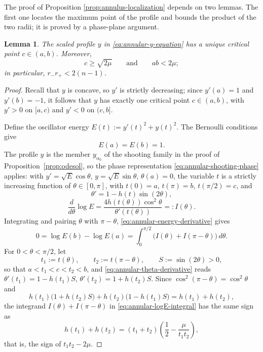 \documentclass[11pt]{article}
\numberwithin{equation}{section}
\newtheorem{lemma}[theorem]{Lemma}
\theoremstyle{definition}
\begin{document}
The proof of Proposition \ref{prop:annulus-localization} depends on two lemmas. The first one locates the maximum point of the profile and bounds the product of the two radii; it is proved by a phase-plane argument.

\begin{lemma}\label{lem:annular-phase}
The scaled profile $y$ in \eqref{eq:annular-y-equation} has a unique critical point $c\in(a,b)$. Moreover,
\[
    c\geq\sqrt{2\mu}
    \qquad\text{and}\qquad
    ab<2\mu;
\]
in particular, $r_-r_+<2(n-1)$.
\end{lemma}

\begin{proof}
Recall that $y$ is concave, so $y'$ is strictly decreasing; since $y'(a)=1$ and $y'(b)=-1$, it follows that $y$ has exactly one critical point $c\in(a,b)$, with $y'>0$ on $[a,c)$ and $y'<0$ on $(c,b]$.


Define the oscillator energy $E(t):=y'(t)^2+y(t)^2$. The Bernoulli conditions give
\begin{equation}\label{eq:annular-energy-derivative}
    E(a)=E(b)=1.
\end{equation}
The profile $y$ is the member $y_{\alpha_0}$ of the shooting family in the proof of Proposition~\ref{prop:odesol}, so the phase representation \eqref{eq:annular-shooting-phase} applies: with $y'=\sqrt E\cos\theta$, $y=\sqrt E\sin\theta$, $\theta(a)=0$, the variable $t$ is a strictly increasing function of $\theta\in[0,\pi]$, with $t(0)=a$, $t(\pi)=b$, $t(\pi/2)=c$, and
\begin{equation}\label{eq:annular-theta-derivative}
    \theta'=1-h(t)\sin(2\theta),
\end{equation}
\begin{equation}\label{eq:annular-logE-theta-derivative}
    \frac{d}{d\theta}\log E
    =
    \frac{4h(t(\theta))\cos^2\theta}{\theta'(t(\theta))}
    =:
    I(\theta).
\end{equation}
Integrating and pairing $\theta$ with $\pi-\theta$, \eqref{eq:annular-energy-derivative} gives
\begin{equation}\label{eq:annular-logE-integral}
    0
    =
    \log E(b)-\log E(a)
    =
    \int_0^{\pi/2}
    \bigl(I(\theta)+I(\pi-\theta)\bigr)\,d\theta.
\end{equation}
For $0<\theta<\pi/2$, let
\[
    t_1:=t(\theta),
    \qquad
    t_2:=t(\pi-\theta),
    \qquad
    S:=\sin(2\theta)>0,
\]
so that $a<t_1<c<t_2<b$, and \eqref{eq:annular-theta-derivative} reads $\theta'(t_1)=1-h(t_1)S$, $\theta'(t_2)=1+h(t_2)S$. Since $\cos^2(\pi-\theta)=\cos^2\theta$ and
\[
    h(t_1)\bigl(1+h(t_2)S\bigr)+h(t_2)\bigl(1-h(t_1)S\bigr)
    =
    h(t_1)+h(t_2),
\]
the integrand $I(\theta)+I(\pi-\theta)$ in \eqref{eq:annular-logE-integral} has the same sign as
\begin{equation}\label{eq:annular-h-sum}
    h(t_1)+h(t_2)
    =
    (t_1+t_2)\left(\frac12-\frac{\mu}{t_1t_2}\right),
\end{equation}
that is, the sign of $t_1t_2-2\mu$.


\end{proof}
\end{document}
